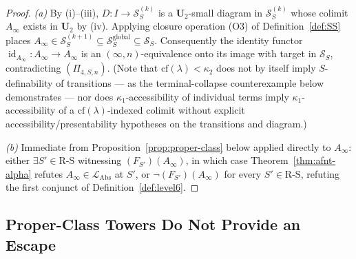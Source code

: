 \documentclass[11pt]{article}
\theoremstyle{plain}
\theoremstyle{definition}
\newcommand{\RS}{\mathrm{R\text{-}S}}
\newcommand{\cS}{\mathcal{S}}
\newcommand{\LAbs}{\mathcal{L}_{\mathrm{Abs}}}
\DeclareMathOperator{\id}{id}
\begin{document}
\begin{proof}
\emph{(a)} By (i)--(iii), $D : I \to \cS_S^{(k)}$ is a $\mathbf{U}_2$-small diagram in $\cS_S^{(k)}$ whose colimit $A_\infty$ exists in $\mathbf{U}_2$ by (iv). Applying closure operation (O3) of Definition~\ref{def:SS} places $A_\infty \in \cS_S^{(k+1)} \subseteq \cS_S^{\mathrm{global}} \subseteq \cS_S$. Consequently the identity functor $\id_{A_\infty} : A_\infty \to A_\infty$ is an $(\infty, n)$-equivalence onto its image with target in $\cS_S$, contradicting $(\Pi_{4, S, n})$. (Note that $\mathrm{cf}(\lambda) < \kappa_2$ does not by itself imply $S$-definability of transitions --- as the terminal-collapse counterexample below demonstrates --- nor does $\kappa_1$-accessibility of individual terms imply $\kappa_1$-accessibility of a $\mathrm{cf}(\lambda)$-indexed colimit without explicit accessibility/presentability hypotheses on the transitions and diagram.)

\emph{(b)} Immediate from Proposition~\ref{prop:proper-class} below applied directly to $A_\infty$: either $\exists S' \in \RS$ witnessing $(F_{S'})(A_\infty)$, in which case Theorem~\ref{thm:afnt-alpha} refutes $A_\infty \in \LAbs$ at $S'$, or $\neg(F_{S'})(A_\infty)$ for every $S' \in \RS$, refuting the first conjunct of Definition~\ref{def:level6}.
\end{proof}

\subsection{Proper-Class Towers Do Not Provide an Escape}
\end{document}
